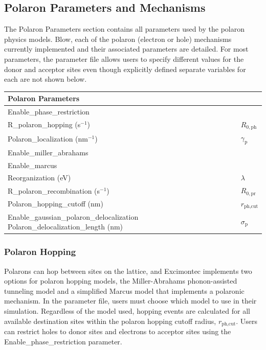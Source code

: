 \documentclass[%
 reprint,onecolumn,notitlepage,
superscriptaddress,longbibliography,
 amsmath,amssymb,
 aps,rmp,floatfix,
]{revtex4-1}
\begin{document}
\subsection{Polaron Parameters and Mechanisms}

The Polaron Parameters section contains all parameters used by the polaron physics models.
Blow, each of the polaron (electron or hole) mechanisms currently implemented and their associated parameters are detailed.
For most parameters, the parameter file allows users to specify different values for the donor and acceptor sites even though explicitly defined separate variables for each are not shown below.

\begin{center}
\begin{tabular}{ l l }
\hline
Polaron Parameters & \\
\hline
Enable\_phase\_restriction & \\
R\_polaron\_hopping (s$^{-1}$) & $R_{0,\text{ph}}$ \\
Polaron\_localization (nm$^{-1}$) & $\gamma_\text{p}$ \\
Enable\_miller\_abrahams & \\
Enable\_marcus & \\
Reorganization (eV) & $\lambda$ \\
R\_polaron\_recombination (s$^{-1}$) & $R_{0,\text{pr}}$ \\
Polaron\_hopping\_cutoff (nm) & $r_{\text{ph,cut}}$ \\
Enable\_gaussian\_polaron\_delocalization
Polaron\_delocalization\_length (nm) & $\sigma_\text{p}$ \\
\end{tabular}
\end{center}

\subsubsection{Polaron Hopping}

Polarons can hop between sites on the lattice, and Excimontec implements two options for polaron hopping models, the Miller-Abrahams phonon-assisted tunneling model\cite{miller1960pr} and a simplified Marcus model \cite{marcus1956jcp} that implements a polaronic mechanism.
In the parameter file, users must choose which model to use in their simulation.
Regardless of the model used, hopping events are calculated for all available destination sites within the polaron hopping cutoff radius, $r_{\text{ph,cut}}$.
Users can restrict holes to donor sites and electrons to acceptor sites using the Enable\_phase\_restriction parameter.
\end{document}
